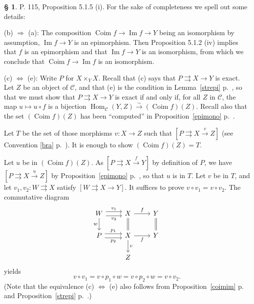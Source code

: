\documentclass[12pt]{article}%
\theoremstyle{remark}
\theoremstyle{definition}
\newtheorem{s}[thm]{\S}%
\newcommand{\nn}{\noindent}
\newcommand{\C}{\mathcal C}
\newcommand{\parar}{\rightrightarrows}
\newcommand{\ssi}{\Leftrightarrow}%
\newcommand{\then}{\Rightarrow}
\newcommand{\xr}{\xrightarrow}
\DeclareMathOperator{\Coim}{Coim}
\DeclareMathOperator{\Ima}{Im}
\DeclareMathOperator{\Hom}{Hom}%
\begin{document}
\begin{s}\label{515i}
P. 115, Proposition 5.1.5 (i). For the sake of completeness we spell out some details:

\nn(b) $\then$ (a): The composition $\Coim f\to\Ima f\to Y$ being an isomorphism by assumption, $\Ima f\to Y$ is an epimorphism. Then Proposition 5.1.2 (iv) implies that $f$ is an epimorphism and that $\Ima f\to Y$ is an isomorphism, from which we conclude that $\Coim f\to\Ima f$ is an isomorphism.

\nn(c) $\ssi$ (e): Write $P$ for $X\times_YX$. Recall that (c) says that $P\parar X\to Y$ is exact. Let $Z$ be an object of $\C$, and that (e) is the condition in Lemma~\ref{strepi} p.~\pageref{strepi}, so that we must show that $P\parar X\to Y$ is exact if and only if, for all $Z$ in $\C$, the map $u\mapsto u\circ f$ is a bijection $\Hom_\C(Y,Z)\xr\sim(\Coim f)(Z)$. Recall also that the set $(\Coim f)(Z)$ has been ``computed'' in Proposition~\ref{epimono} p.~\pageref{epimono}.

Let $T$ be the set of those morphisms $v:X\to Z$ such that $[P\parar X\xr vZ]$ (see Convention \ref{bra} p.~\pageref{bra}). It is enough to show $(\Coim f)(Z)=T$.

Let $u$ be in $(\Coim f)(Z)$. As $[P\parar X\xr fY]$ by definition of $P$, we have $[P\parar X\xr uZ]$ by Proposition~\ref{epimono} p.~\pageref{epimono}, so that $u$ is in $T$. Let $v$ be in $T$, and let $v_1,v_2:W\parar X$ satisfy $[W\parar X\to Y]$. It suffices to prove $v\circ v_1=v\circ v_2$. The commutative diagram  
$$
\begin{tikzcd}
W\ar[yshift=0.7ex]{r}{v_1}\ar[yshift=-0.7ex]{r}[swap]{v_2}\ar{d}[swap]{w}&X\ar{r}{f}\ar[equal]{d}&Y\ar[equal]{d}\\ 
P\ar[yshift=0.7ex]{r}{p_1}\ar[yshift=-0.7ex]{r}[swap]{p_2}&X\ar{r}[swap]{f}\ar{d}{v}&Y\\ 
{}&Z
\end{tikzcd}
$$ 
yields
$$
v\circ v_1=v\circ p_1\circ w=v\circ p_2\circ w=v\circ v_2.
$$
(Note that the equivalence (c) $\ssi$ (e) also follows from Proposition~\ref{coimim} p.~\pageref{coimim} and Proposition~\ref{strepi} p.~\pageref{strepi}.)
\end{s}

%
\end{document}
